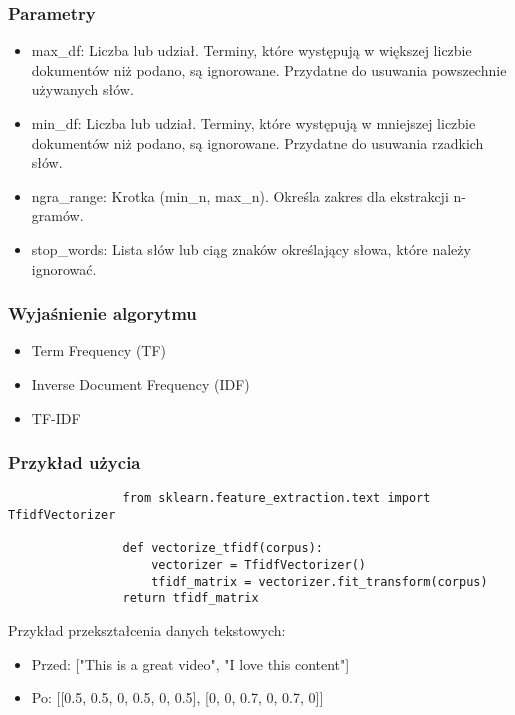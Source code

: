 		
		\subsubsection{Parametry}
			\begin{itemize}
				\item max\_df: Liczba lub udział. Terminy, które występują w większej liczbie dokumentów niż podano, są ignorowane. Przydatne do usuwania powszechnie używanych słów.
				\item min\_df: Liczba lub udział. Terminy, które występują w mniejszej liczbie dokumentów niż podano, są ignorowane. Przydatne do usuwania rzadkich słów.
				\item ngra\_range: Krotka (min\_n, max\_n). Określa zakres dla ekstrakcji n-gramów.
				\item stop\_words: Lista słów lub ciąg znaków określający słowa, które należy ignorować.
			\end{itemize}
		
		\subsubsection{Wyjaśnienie algorytmu}
			\begin{itemize}
				\item Term Frequency (TF)
				\item Inverse Document Frequency (IDF)
				\item TF-IDF
			\end{itemize}
			
				
		\subsubsection{Przykład użycia}
			\begin{verbatim}
				from sklearn.feature_extraction.text import TfidfVectorizer
	
				def vectorize_tfidf(corpus):
					vectorizer = TfidfVectorizer()
					tfidf_matrix = vectorizer.fit_transform(corpus)
				return tfidf_matrix
			\end{verbatim}

			Przykład przekształcenia danych tekstowych:	
			\begin{itemize}
				\item Przed: ["This is a great video", "I love this content"]
				\item Po: [[0.5, 0.5, 0, 0.5, 0, 0.5], [0, 0, 0.7, 0, 0.7, 0]]
			\end{itemize}
			
